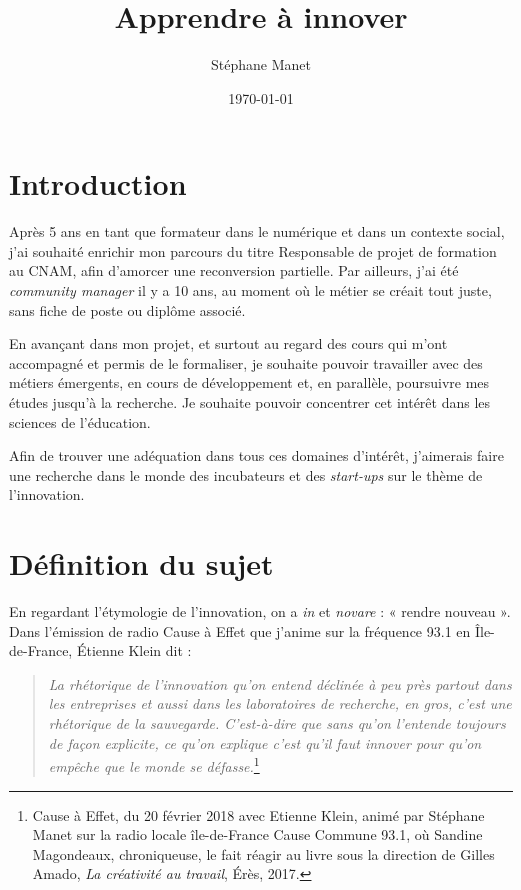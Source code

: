 \documentclass{article}
\author{Stéphane Manet}
\title{Apprendre à innover}
\date{\today}
\begin{document}
\maketitle %
\tableofcontents

\section*{Introduction}

Après 5 ans en tant que formateur dans le numérique et dans un contexte social, j’ai souhaité enrichir mon parcours du titre Responsable de projet de formation au CNAM, afin d'amorcer une reconversion partielle. 
Par ailleurs, j'ai été \textit{community manager} il y a 10 ans, au moment où le métier se créait tout juste, sans fiche de poste ou diplôme associé. 

En avançant dans mon projet, et surtout au regard des cours qui m'ont accompagné et permis de le formaliser, je souhaite pouvoir travailler avec des métiers émergents, en cours de développement et, en parallèle, poursuivre mes études jusqu'à la recherche. Je souhaite pouvoir concentrer cet intérêt dans les sciences de l'éducation.

Afin de trouver une adéquation dans tous ces domaines d'intérêt, j'aimerais faire une recherche dans le monde des incubateurs et des \textit{start-ups} sur le thème de l'innovation.

\section{Définition du sujet}

En regardant l'étymologie de l'innovation, on a \textit{in} et \textit{novare} : « rendre nouveau ». Dans l'émission de radio Cause à Effet que j'anime sur la fréquence 93.1 en Île-de-France, Étienne Klein dit :

\begin{quote}
\textit{La rhétorique de l'innovation qu'on entend déclinée à peu près partout dans les entreprises et aussi dans les laboratoires de recherche, en gros, c'est une rhétorique de la sauvegarde. C'est-à-dire que sans qu'on l'entende toujours de façon explicite, ce qu'on explique c'est qu'il faut innover pour qu'on empêche que le monde se défasse.}\footnote{Cause à Effet, du 20 février 2018 avec Etienne Klein, animé par Stéphane Manet sur la radio locale île-de-France Cause Commune 93.1, où Sandine Magondeaux, chroniqueuse, le fait réagir au livre sous la direction de Gilles Amado, \textit{La créativité au travail}, Érès, 2017.}
\end{quote} 
\end{document}
